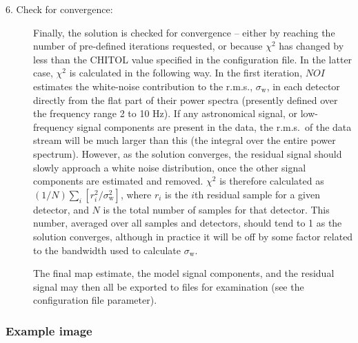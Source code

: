 \documentclass[oneside,11pt]{starlink}
\begin{document}
\begin{description}
\item[6. Check for convergence:] Finally, the solution is checked for
  convergence -- either by reaching the number of pre-defined
  iterations requested, or because $\chi^2$ has changed by less than
  the CHITOL value specified in the configuration file. In the latter
  case, $\chi^2$ is calculated in the following way. In the first
  iteration, $NOI$ estimates the white-noise contribution to the
  r.m.s., $\sigma_{\textrm{w}}$, in each detector directly from the flat
  part of their power spectra (presently defined over the frequency
  range 2 to 10 Hz). If any astronomical signal, or low-frequency
  signal components are present in the data, the r.m.s.\ of the data
  stream will be much larger than this (the integral over the entire
  power spectrum). However, as the solution converges, the residual
  signal should slowly approach a white noise distribution, once the
  other signal components are estimated and removed. $\chi^2$ is
  therefore calculated as $(1/N) \sum_i[ r_i^2/\sigma^2_{\textrm{w}}]$,
  where $r_i$ is the $i$th residual sample for a given detector, and
  $N$ is the total number of samples for that detector. This number,
  averaged over all samples and detectors, should tend to 1 as the
  solution converges, although in practice it will be off by some
  factor related to the bandwidth used to calculate $\sigma_{\textrm{w}}$.

  The final map estimate, the model signal components, and the
  residual signal may then all be exported to files for examination
  (see the  configuration file parameter).

\end{description}

\subsubsection{Example image}
\end{document}
